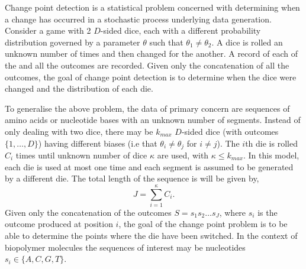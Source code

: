 Change point detection is a statistical problem concerned with determining when a change has occurred in a stochastic process underlying data generation. 
Consider a game with 2 $D$-sided dice, each with a different probability distribution governed by a parameter $\theta$ such that $\theta_1 \neq \theta_2$. A dice is rolled an unknown number of times and then changed for the another. 
A record of each of the and all the outcomes are recorded. Given only the concatenation of all the outcomes, the goal of change point detection is to determine when the dice were changed and the distribution of each die. 

To generalise the above problem, the data of primary concern are sequences of amino acids or nucleotide bases with an unknown number of segments. 
Instead of only dealing with two dice, there may be $k_{max}$ $D$-sided dice (with outcomes $\{1,\ldots,D\}$) having different biases (i.e that $\theta_i\neq \theta_j$ for $i\neq j$). 
The $i$th die is rolled $C_i$ times until unknown number of dice $\kappa$ are used, with $\kappa\leq k_{max}$. In this model, each die is used at most one time and each segment is assumed to be generated by a different die. The total length of the sequence is will be given by, 
    \begin{equation}
        J = \sum_{i=1}^{\kappa}C_i.
    \end{equation}
Given only the concatenation of the outcomes $S = s_1s_2\ldots s_J$, where $s_i$ is the outcome produced at position $i$, the goal of the change point problem is to be able to determine the points where the die have been switched. In the context of biopolymer molecules the sequences of interest may be nucleotides $s_i \in \{A,C,G,T\}$.

